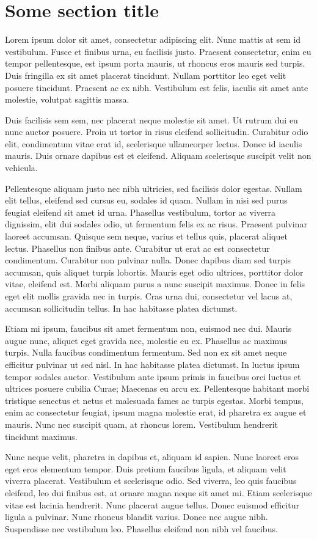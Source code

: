 \section{Some section title}

Lorem ipsum dolor sit amet, consectetur adipiscing elit. Nunc mattis at sem id vestibulum. Fusce et finibus urna, eu facilisis justo. Praesent consectetur, enim eu tempor pellentesque, est ipsum porta mauris, ut rhoncus eros mauris sed turpis. Duis fringilla ex sit amet placerat tincidunt. Nullam porttitor leo eget velit posuere tincidunt. Praesent ac ex nibh. Vestibulum est felis, iaculis sit amet ante molestie, volutpat sagittis massa.

Duis facilisis sem sem, nec placerat neque molestie sit amet. Ut rutrum dui eu nunc auctor posuere. Proin ut tortor in risus eleifend sollicitudin. Curabitur odio elit, condimentum vitae erat id, scelerisque ullamcorper lectus. Donec id iaculis mauris. Duis ornare dapibus est et eleifend. Aliquam scelerisque suscipit velit non vehicula.

Pellentesque aliquam justo nec nibh ultricies, sed facilisis dolor egestas. Nullam elit tellus, eleifend sed cursus eu, sodales id quam. Nullam in nisi sed purus feugiat eleifend sit amet id urna. Phasellus vestibulum, tortor ac viverra dignissim, elit dui sodales odio, ut fermentum felis ex ac risus. Praesent pulvinar laoreet accumsan. Quisque sem neque, varius et tellus quis, placerat aliquet lectus. Phasellus non finibus ante. Curabitur ut erat ac est consectetur condimentum. Curabitur non pulvinar nulla. Donec dapibus diam sed turpis accumsan, quis aliquet turpis lobortis. Mauris eget odio ultrices, porttitor dolor vitae, eleifend est. Morbi aliquam purus a nunc suscipit maximus. Donec in felis eget elit mollis gravida nec in turpis. Cras urna dui, consectetur vel lacus at, accumsan sollicitudin tellus. In hac habitasse platea dictumst.

Etiam mi ipsum, faucibus sit amet fermentum non, euismod nec dui. Mauris augue nunc, aliquet eget gravida nec, molestie eu ex. Phasellus ac maximus turpis. Nulla faucibus condimentum fermentum. Sed non ex sit amet neque efficitur pulvinar ut sed nisl. In hac habitasse platea dictumst. In luctus ipsum tempor sodales auctor. Vestibulum ante ipsum primis in faucibus orci luctus et ultrices posuere cubilia Curae; Maecenas eu arcu ex. Pellentesque habitant morbi tristique senectus et netus et malesuada fames ac turpis egestas. Morbi tempus, enim ac consectetur feugiat, ipsum magna molestie erat, id pharetra ex augue et mauris. Nunc nec suscipit quam, at rhoncus lorem. Vestibulum hendrerit tincidunt maximus.

Nunc neque velit, pharetra in dapibus et, aliquam id sapien. Nunc laoreet eros eget eros elementum tempor. Duis pretium faucibus ligula, et aliquam velit viverra placerat. Vestibulum et scelerisque odio. Sed viverra, leo quis faucibus eleifend, leo dui finibus est, at ornare magna neque sit amet mi. Etiam scelerisque vitae est lacinia hendrerit. Nunc placerat augue tellus. Donec euismod efficitur ligula a pulvinar. Nunc rhoncus blandit varius. Donec nec augue nibh. Suspendisse nec vestibulum leo. Phasellus eleifend non nibh vel faucibus.